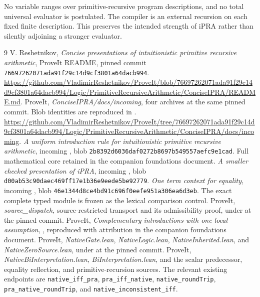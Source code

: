 \documentclass[11pt,a4paper]{article}
\theoremstyle{definition}\newtheorem{definition}[theorem]{Definition}
\begin{document}
No variable ranges over primitive-recursive program descriptions, and
no total universal evaluator is postulated. The compiler is an external
recursion on each fixed finite description. This preserves the intended
strength of iPRA rather than silently adjoining a stronger evaluator.

\begingroup\small\raggedright
\begin{thebibliography}{9}
 V. Reshetnikov, \emph{Concise presentations of intuitionistic primitive recursive arithmetic}, ProveIt README, pinned commit \texttt{76697262071ada91f29c14d9cf3801a64dacb994}.\newline
\url{https://github.com/VladimirReshetnikov/ProveIt/blob/76697262071ada91f29c14d9cf3801a64dacb994/Logic/PrimitiveRecursiveArithmetic/ConciseIPRA/README.md}.
 ProveIt, \emph{ConciseIPRA/docs/incoming}, four archives at the same pinned commit. Blob identities are reproduced in .\newline
\url{https://github.com/VladimirReshetnikov/ProveIt/tree/76697262071ada91f29c14d9cf3801a64dacb994/Logic/PrimitiveRecursiveArithmetic/ConciseIPRA/docs/incoming}.
 \emph{A uniform introduction rule for intuitionistic primitive recursive arithmetic}, incoming , blob \texttt{2b8392d6036daf0272b8697b549557aefc9e1cad}. Full mathematical core retained in the companion foundations document.
 \emph{A smaller checked presentation of iPRA}, incoming , blob \texttt{d00ab53c90daec469ff17e1b36e9eede5be92779}.
 \emph{One term context for equality}, incoming , blob \texttt{46e1344d8ce4bd91c696f0eefe951a306ea6d3eb}. The exact complete typed module is frozen as the lexical comparison control.
 ProveIt, \emph{source\_dispatch}, source-restricted transport and its admissibility proof, under  at the pinned commit.
 ProveIt, \emph{Complementary introductions with one local assumption}, , reproduced with attribution in the companion foundations document.
 ProveIt, \emph{NativeGate.lean}, \emph{NativeLogic.lean}, \emph{NativeInherited.lean}, and \emph{NativeZeroSource.lean}, under  at the pinned commit.
 ProveIt, \emph{NativeBiInterpretation.lean}, \emph{BiInterpretation.lean}, and the scalar predecessor, equality reflection, and primitive-recursion sources. The relevant existing endpoints are \texttt{native\_iff\_pra}, \texttt{pra\_iff\_native}, \texttt{native\_roundTrip}, \texttt{pra\_native\_roundTrip}, and \texttt{native\_inconsistent\_iff}.
\end{thebibliography}
\endgroup
\end{document}
